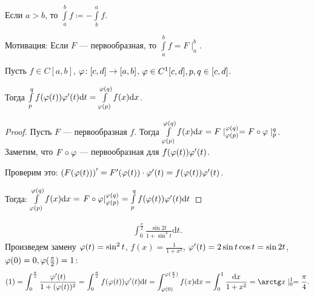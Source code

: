 \begin{remark}[Соглашение]
    Если $a>b$, то  $\int\limits_a^b f \coloneqq -\int\limits_b^a f$.

    Мотивация: Если  $F$ --- первообразная, то  $\int\limits_a^b f = F \mid_a^b$.
\end{remark}
\begin{theorem}
    Пусть $f \in C[a, b]$, $\varphi\!: [c,d] \to [a,b]$, $\varphi \in C^1[c,d], p, q \in [c, d]$.

    Тогда  $\int\limits_p^q f(\varphi(t)) \varphi'(t) \mathrm{d}t = \int\limits_{\varphi(p)}^{\varphi(q)} f(x) \mathrm{d}x$.
\end{theorem}
\begin{proof}
    Пусть $F$ --- первообразная  $f$. Тогда  $\int\limits_{\varphi(p)}^{\varphi(q)}f(x) \mathrm{d}x = F \mid_{\varphi(p)}^{\varphi(q)} = F \circ \varphi\mid_p^q$. Заметим, что  $F \circ \varphi$ --- первообразная для  $f(\varphi(t))\varphi'(t)$.

    Проверим это:  $\left(F(\varphi(t))\right)' = F'(\varphi(t)) \cdot \varphi'(t) = f(\varphi(t))\varphi'(t)$.

    Тогда: $\int\limits_{\varphi(p)}^{\varphi(q)}f(x)\mathrm{d}x = \left.F \circ \varphi\right|_{\varphi(p)}^{\varphi(q)} =  \int\limits_{p}^qf(\varphi(t))\varphi'(t) \mathrm{d}t$
\end{proof}
\begin{example}
\begin{align}
    \int_0^{\frac{\pi}{2}} \frac{\sin 2t}{1 + \sin^4 t} \mathrm{d}t 
.\end{align}
Произведем замену $\varphi(t) = \sin^2 t$,  $f(x) = \frac{1}{1+x^2}$, $\varphi'(t) = 2 \sin t \cos t = \sin 2t$, $\varphi(0) = 0, \varphi(\frac{\pi}{2}) = 1$:
\begin{align*}
	(1) = \int_{0}^{\frac{\pi}{2}} \frac{\vphi'(t)}{1 + (\vphi(t))^2} =  \int_0^{\frac{\pi}2} f(\vphi(t))\vphi'(t)\mathrm{d}t = \int_{\vphi(0)}^{\vphi(\frac{\pi}{2})} f(x)\mathrm{d}x = \int_0^1 \frac{\mathrm{d}x}{1+x^2} = \arctg x \mid_0^1 = \frac{\pi}{4}.
\end{align*}
\end{example}
